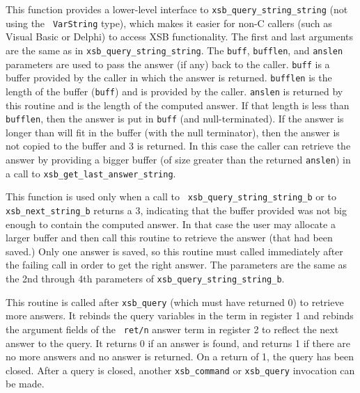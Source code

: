 \begin{description}
  This function provides a lower-level
interface to {\tt xsb\_query\_string\_string} (not using the {\tt
VarString} type), which makes it easier for non-C callers (such as
Visual Basic or Delphi) to access XSB functionality.  The first and
last arguments are the same as in {\tt xsb\_query\_string\_string}.
The \verb|buff|, \verb|bufflen|, and \verb|anslen| parameters are used
to pass the answer (if any) back to the caller.  \verb|buff| is a
buffer provided by the caller in which the answer is returned.
\verb|bufflen| is the length of the buffer (\verb|buff|) and is
provided by the caller.  \verb|anslen| is returned by this routine and
is the length of the computed answer.  If that length is less than
\verb|bufflen|, then the answer is put in \verb|buff| (and
null-terminated).  If the answer is longer than will fit in the buffer
(with the null terminator), then the answer is not copied to the
buffer and 3 is returned.  In this case the caller can retrieve the
answer by providing a bigger buffer (of size greater than the returned
\verb|anslen|) in a call to {\tt xsb\_get\_last\_answer\_string}.

  This
function is used only when a call to {\tt
xsb\_query\_string\_string\_b} or to {\tt xsb\_next\_string\_b}
returns a 3, indicating that the buffer provided was not big enough to
contain the computed answer.  In that case the user may allocate a
larger buffer and then call this routine to retrieve the answer (that
had been saved.)  Only one answer is saved, so this routine must
called immediately after the failing call in order to get the right
answer.  The parameters are the same as the 2nd through 4th parameters
of {\tt xsb\_query\_string\_string\_b}.

 
This routine is called after {\tt xsb\_query} (which must have
returned 0) to retrieve more answers.  It rebinds the query variables
in the term in register 1 and rebinds the argument fields of the {\tt
ret/n} answer term in register 2 to reflect the next answer to the
query.  It returns 0 if an answer is found, and returns 1 if there are
no more answers and no answer is returned. On a return of 1, the query
has been closed.  After a query is closed, another {\tt xsb\_command}
or {\tt xsb\_query} invocation can be made.


\end{description}
